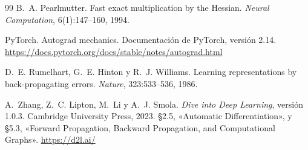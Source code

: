\begin{thebibliography}{99}
B.~A. Pearlmutter.
\newblock Fast exact multiplication by the Hessian.
\newblock \emph{Neural Computation}, 6(1):147--160, 1994.

PyTorch.
\newblock Autograd mechanics. Documentación de PyTorch, versión 2.14.
\newblock \url{https://docs.pytorch.org/docs/stable/notes/autograd.html}

D.~E. Rumelhart, G.~E. Hinton y R.~J. Williams.
\newblock Learning representations by back-propagating errors.
\newblock \emph{Nature}, 323:533--536, 1986.

A.~Zhang, Z.~C. Lipton, M.~Li y A.~J. Smola.
\newblock \emph{Dive into Deep Learning}, versión 1.0.3.
\newblock Cambridge University Press, 2023.
\newblock §2.5, «Automatic Differentiation», y §5.3, «Forward Propagation, Backward Propagation, and Computational Graphs».
\newblock \url{https://d2l.ai/}

\end{thebibliography}
